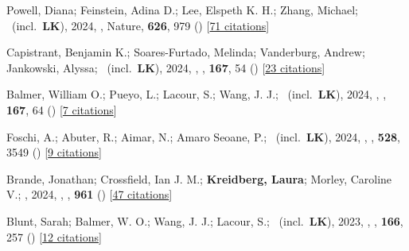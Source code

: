 \item[{\color{numcolor}\scriptsize103}] Powell, Diana; Feinstein, Adina D.; Lee, Elspeth K. H.; Zhang, Michael; \etal\ (incl.\ \textbf{LK}), 2024, , Nature, \textbf{626}, 979 () [\href{https://ui.adsabs.harvard.edu/abs/2024Natur.626..979P}{71 citations}]

\item[{\color{numcolor}\scriptsize102}] Capistrant, Benjamin K.; Soares-Furtado, Melinda; Vanderburg, Andrew; Jankowski, Alyssa; \etal\ (incl.\ \textbf{LK}), 2024, , \aj, \textbf{167}, 54 () [\href{https://ui.adsabs.harvard.edu/abs/2024AJ....167...54C}{23 citations}]

\item[{\color{numcolor}\scriptsize101}] Balmer, William O.; Pueyo, L.; Lacour, S.; Wang, J. J.; \etal\ (incl.\ \textbf{LK}), 2024, , \aj, \textbf{167}, 64 () [\href{https://ui.adsabs.harvard.edu/abs/2024AJ....167...64B}{7 citations}]

\item[{\color{numcolor}\scriptsize100}] Foschi, A.; Abuter, R.; Aimar, N.; Amaro Seoane, P.; \etal\ (incl.\ \textbf{LK}), 2024, , \mnras, \textbf{528}, 3549 () [\href{https://ui.adsabs.harvard.edu/abs/2024MNRAS.528.3549F}{9 citations}]

\item[{\color{numcolor}\scriptsize99}] Brande, Jonathan; Crossfield, Ian J. M.; \textbf{Kreidberg, Laura}; Morley, Caroline V.; \etal, 2024, , \apj, \textbf{961} () [\href{https://ui.adsabs.harvard.edu/abs/2024ApJ...961L..23B}{47 citations}]

\item[{\color{numcolor}\scriptsize98}] Blunt, Sarah; Balmer, W. O.; Wang, J. J.; Lacour, S.; \etal\ (incl.\ \textbf{LK}), 2023, , \aj, \textbf{166}, 257 () [\href{https://ui.adsabs.harvard.edu/abs/2023AJ....166..257B}{12 citations}]


